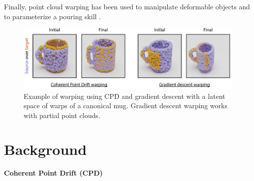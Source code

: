 \documentclass{article}
\begin{document}
Finally, point cloud warping has been used to manipulate deformable objects \cite{lee15learning,schulman16learning} and to parameterize a pouring skill \cite{brandi14generalizing}.




\begin{figure}
    \centering
    \includegraphics[width=\textwidth]{figures/warping.pdf}
    \caption{Example of warping using CPD and gradient descent with a latent space of warps of a canonical mug. Gradient descent warping works with partial point clouds.}
    \label{fig:warping}
\end{figure}


\section{Background}
\label{sec:background}

\paragraph{Coherent Point Drift (CPD)}
\end{document}

